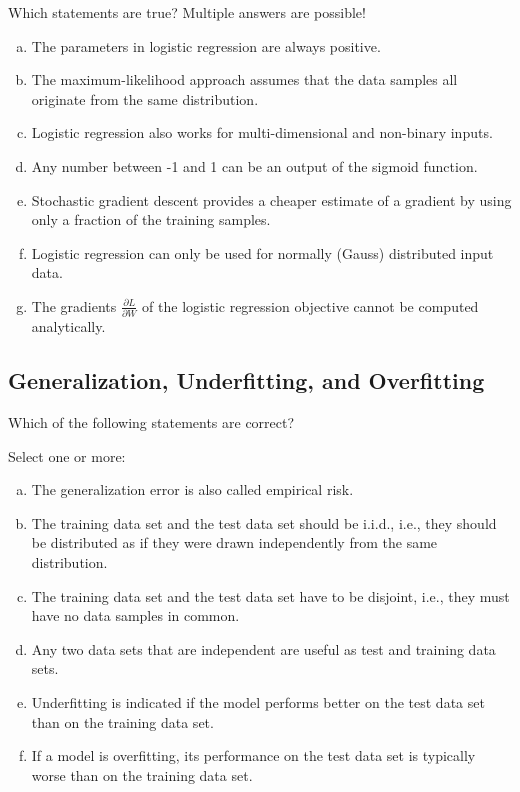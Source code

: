 \documentclass{article}
\begin{document}
Which statements are true? Multiple answers are possible!

\begin{enumerate}[(a)]
    \item The parameters in logistic regression are always positive.
    \item The maximum-likelihood approach assumes that the data samples all originate from the same distribution.
    \item Logistic regression also works for multi-dimensional and non-binary inputs.
    \item Any number between -1 and 1 can be an output of the sigmoid function.
    \item Stochastic gradient descent provides a cheaper estimate of a gradient by using only a fraction of the training samples.
    \item Logistic regression can only be used for normally (Gauss) distributed input data.
    \item The gradients $\frac{\partial L}{\partial W}$ of the logistic regression objective cannot be computed analytically.
\end{enumerate}

\subsection*{Generalization, Underfitting, and Overfitting}

Which of the following statements are correct?

Select one or more:

\begin{enumerate}[(a)]
    \item The generalization error is also called empirical risk.
    \item The training data set and the test data set should be i.i.d., i.e., they should be distributed as if they were drawn independently from the same distribution.
    \item The training data set and the test data set have to be disjoint, i.e., they must have no data samples in common.
    \item Any two data sets that are independent are useful as test and training data sets.
    \item Underfitting is indicated if the model performs better on the test data set than on the training data set.
    \item If a model is overfitting, its performance on the test data set is typically worse than on the training data set.
\end{enumerate}
\end{document}
